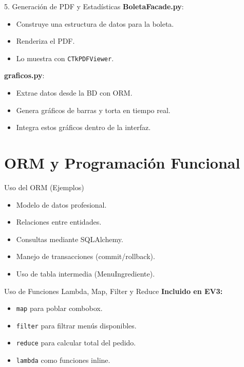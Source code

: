 \documentclass{beamer}
\begin{document}
\begin{frame}{5. Generación de PDF y Estadísticas}
\textbf{BoletaFacade.py}:
\begin{itemize}
    \item Construye una estructura de datos para la boleta.
    \item Renderiza el PDF.
    \item Lo muestra con \texttt{CTkPDFViewer}.
\end{itemize}

\bigskip

\textbf{graficos.py}:
\begin{itemize}
    \item Extrae datos desde la BD con ORM.
    \item Genera gráficos de barras y torta en tiempo real.
    \item Integra estos gráficos dentro de la interfaz.
\end{itemize}
\end{frame}


\section{ORM y Programación Funcional}

\begin{frame}{Uso del ORM (Ejemplos)}
    \begin{itemize}
        \item Modelo de datos profesional.
        \item Relaciones entre entidades.
        \item Consultas mediante SQLAlchemy.
        \item Manejo de transacciones (commit/rollback).
        \item Uso de tabla intermedia (MenuIngrediente).
    \end{itemize}
\end{frame}


\begin{frame}{Uso de Funciones Lambda, Map, Filter y Reduce}
    \textbf{Incluido en EV3:}
    \begin{itemize}
        \item \texttt{map} para poblar combobox.
        \item \texttt{filter} para filtrar menús disponibles.
        \item \texttt{reduce} para calcular total del pedido.
        \item \texttt{lambda} como funciones inline.
    \end{itemize}
\end{frame}
\end{document}
